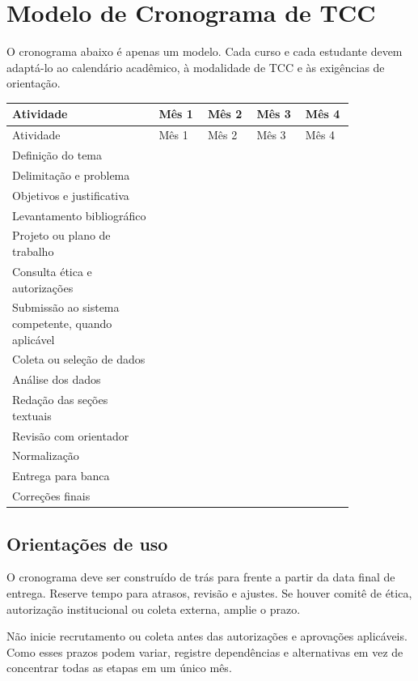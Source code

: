 \chapter{Modelo de Cronograma de TCC}

O cronograma abaixo é apenas um modelo. Cada curso e cada estudante devem adaptá-lo ao calendário acadêmico, à modalidade de TCC e às exigências de orientação.

\begin{longtable}{p{0.36\linewidth}p{0.12\linewidth}p{0.12\linewidth}p{0.12\linewidth}p{0.12\linewidth}}
\toprule
Atividade & Mês 1 & Mês 2 & Mês 3 & Mês 4 \\
\midrule
\endfirsthead
\toprule
Atividade & Mês 1 & Mês 2 & Mês 3 & Mês 4 \\
\midrule
\endhead
Definição do tema & & & & \\
Delimitação e problema & & & & \\
Objetivos e justificativa & & & & \\
Levantamento bibliográfico & & & & \\
Projeto ou plano de trabalho & & & & \\
Consulta ética e autorizações & & & & \\
Submissão ao sistema competente, quando aplicável & & & & \\
Coleta ou seleção de dados & & & & \\
Análise dos dados & & & & \\
Redação das seções textuais & & & & \\
Revisão com orientador & & & & \\
Normalização & & & & \\
Entrega para banca & & & & \\
Correções finais & & & & \\
\bottomrule
\end{longtable}

\section{Orientações de uso}

O cronograma deve ser construído de trás para frente a partir da data final de entrega. Reserve tempo para atrasos, revisão e ajustes. Se houver comitê de ética, autorização institucional ou coleta externa, amplie o prazo.

Não inicie recrutamento ou coleta antes das autorizações e aprovações aplicáveis. Como esses prazos podem variar, registre dependências e alternativas em vez de concentrar todas as etapas em um único mês.
